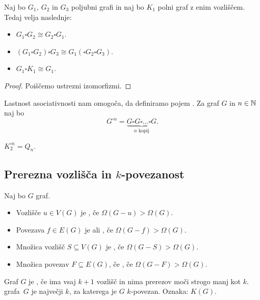 \begin{trditev}
    Naj bo $G_1, \ G_2$ in $G_3$ poljubni grafi in naj bo $K_1$ polni graf z enim vozliščem. Tedaj velja naslednje:
    \begin{itemize}
        \item $G_1 \square G_2 \cong G_2 \square G_1$.
        \item $(G_1 \square G_2) \square G_3 \cong G_1 (\square G_2 \square G_3)$.
        \item $G_1 \square K_1 \cong G_1$.
    \end{itemize}
\end{trditev}

\begin{proof}
    Poiščemo ustrezni izomorfizmi.
\end{proof}

Lastnost asociativnosti nam omogoča, da definiramo pojem . Za graf $G$ in $n \in \mathbb{N}$ naj bo $$G^{\square n} = \underbrace{G \square G \square \ldots \square G}_\text{$n$ kopij}.$$

\begin{primer}
    $K_2^{\square n} = Q_n$.
\end{primer}

\subsection{Prerezna vozlišča in $k$-povezanost}
\begin{definicija}
    Naj bo $G$ graf.
    \begin{itemize}
        \item Vozlišče $u \in V(G)$ je , če $\Omega(G-u) > \Omega(G)$.
        \item Povezava $f \in E(G)$ je  ali , če $\Omega(G-f) > \Omega(G)$.
        \item Množica vozlišč $S \subseteq V(G)$ je , če $\Omega(G-S) > \Omega(G)$.
        \item Množica povezav $F \subseteq E(G)$, če , če $\Omega(G-F) > \Omega(G)$.
    \end{itemize}
\end{definicija}

\begin{definicija}
    Graf $G$ je , če ima vsaj $k+1$ vozlišč in nima prerezov moči strogo manj kot $k$.  grafa~$G$ je največji $k$, za katerega je $G$ $k$-povezan. Oznaka: $K(G)$.
\end{definicija}

